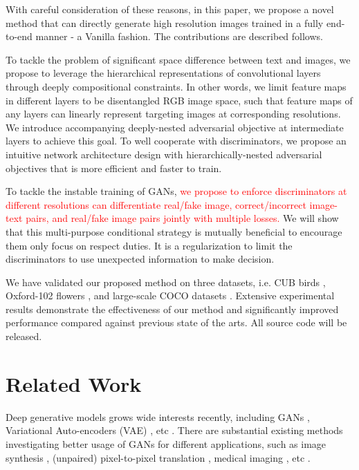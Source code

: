 \documentclass[10pt,twocolumn,letterpaper]{article}
\begin{document}
With careful consideration of these reasons, in this paper, we propose a novel method that can directly generate high resolution images trained in a fully end-to-end manner - a Vanilla fashion. The contributions are described follows.

To tackle the problem of significant space difference between text and images, we propose to leverage the hierarchical representations of convolutional layers through deeply compositional constraints. In other words, we limit feature maps in different layers to be disentangled RGB image space, such that feature maps of any layers can linearly represent targeting images at corresponding resolutions. We introduce accompanying deeply-nested adversarial objective at intermediate layers to achieve this goal.
To well cooperate with discriminators, we propose an intuitive network architecture design with hierarchically-nested adversarial objectives that is more efficient and faster to train.

To tackle the instable training of GANs, 
\textcolor{red}{we propose to enforce discriminators at different resolutions can differentiate real/fake image, correct/incorrect image-text pairs, and real/fake image pairs jointly with multiple losses.} We will show that this multi-purpose conditional strategy is mutually beneficial to encourage them only focus on respect duties. It is a regularization to limit the discriminators to use unexpected information to make decision. 

We have validated our proposed method on three datasets, i.e. CUB birds \cite{}, Oxford-102 flowers \cite{}, and large-scale COCO datasets \cite{}. Extensive experimental results demonstrate the effectiveness of our method and significantly improved performance compared against previous state of the arts. All source code will be released.


\section{Related Work}
Deep generative models grows wide interests recently, including GANs \cite{goodfellow2014generative}, Variational Auto-encoders (VAE) \cite{kingma2013auto}, etc \cite{oord2016pixel}. 
There are substantial existing methods investigating better usage of GANs for different applications, such as image synthesis \cite{radford2015unsupervised, shrivastava2016learning}, (unpaired) pixel-to-pixel translation \cite{isola2016image,zhu2017unpaired},  medical imaging \cite{costa2017towards}, etc \cite{ledig2016photo,huang2016stacked}.
\end{document}
